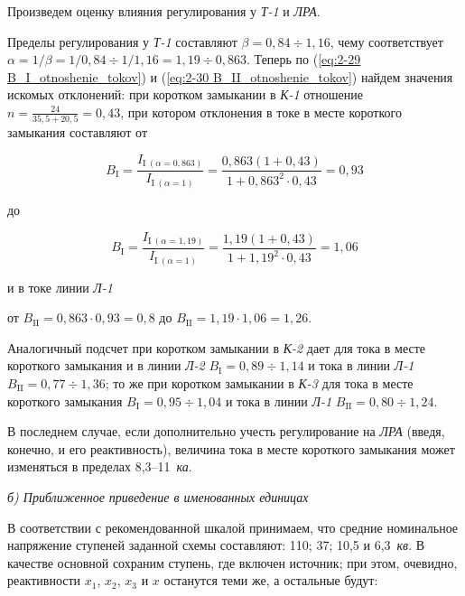 \begin{small}
	Произведем оценку влияния регулирования у \textit{Т-1} и \textit{ЛРА}.
	
	Пределы регулирования у \textit{Т-1} составляют $ \beta = 0,84 \div 1,16 $, чему соответствует $ \alpha = 1/\beta = 1/0,84 \div 1/1,16 = 1,19 \div 0,863 $. Теперь по (\ref{eq:2-29 B_I_otnoshenie_tokov}) и (\ref{eq:2-30 B_II_otnoshenie_tokov}) найдем значения искомых отклонений: при коротком замыкании в \textit{К-1} отношение $ n = \frac{24}{35,5 + 20,5} = 0,43 $, при котором отклонения в токе в месте короткого замыкания составляют от
	
	\begin{equation*}
		B_{\text{I}} = \frac{I_{\text{I}~(\alpha=0,863)}}{I_{\text{I}~(\alpha=1)}} = \frac{0,863 (1+0,43)}{1 + 0,863^2 \cdot 0,43} = 0,93
	\end{equation*}
	
	до
	
	\begin{equation*}
		B_\text{I} = \frac{I_{\text{I}~(\alpha=1,19)}}{I_{\text{I}~(\alpha=1)}} = \frac{1,19 (1+0,43)}{1 + 1,19^2 \cdot 0,43} = 1,06
	\end{equation*}
	
	и в токе линии \textit{Л-1}
	
	от $ B_{\text{II}} = 0,863 \cdot 0,93 = 0,8 $ до $ B_{\text{II}} = 1,19 \cdot 1,06 = 1,26 $.
	
	Аналогичный подсчет при коротком замыкании в \textit{К-2} дает для тока в месте короткого замыкания и в линии \textit{Л-2} $ B_{\text{I}} = 0,89 \div 1,14 $ и тока в линии \textit{Л-1} $ B_{\text{II}} = 0,77 \div 1,36 $; то же при коротком замыкании в \textit{К-3} для тока в месте короткого замыкания $ B_{\text{I}} = 0,95 \div 1,04 $ и тока в линии \textit{Л-1} $ B_{\text{II}} = 0,80 \div 1,24 $.
	
	В последнем случае, если дополнительно учесть регулирование на \textit{ЛРА} (введя, конечно, и его реактивность), величина тока в месте короткого замыкания может изменяться в пределах  8,3--11~\textit{ка}.
	
	\vspace{1pc}
	\textit{б) Приближенное приведение в именованных единицах}
	
	В соответствии с рекомендованной шкалой принимаем, что средние номинальное напряжение ступеней заданной схемы составляют: 110; 37; 10,5 и 6,3~\textit{кв}. В качестве основной сохраним ступень, где включен источник; при этом, очевидно, реактивности $ x_1 $, $ x_2 $, $ x_3 $ и $ x $ останутся теми же, а остальные будут:
	

\end{small}

